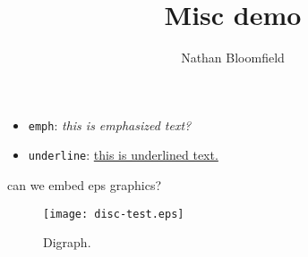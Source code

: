 \documentclass{ximera}
\title{Misc demo}
\author{Nathan Bloomfield}
\begin{document}
\maketitle

\begin{itemize}
\item \texttt{emph}: \emph{this is emphasized text?}
\item \texttt{underline}: \underline{this is underlined text.}
\end{itemize}

can we embed eps graphics?

\begin{figure}[!htb]
\begin{center}
\texttt{[image: disc-test.eps]}
\caption{Digraph.}
\end{center}
\label{fig:digraph}
\end{figure}
\end{document}
